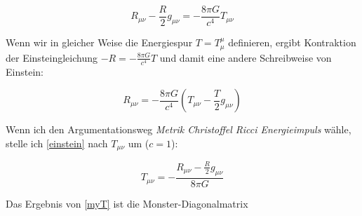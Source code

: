 \documentclass[12pt,a4paper]{article}
\begin{document}
\begin{equation}
R_{\mu\nu} - \frac{R}{2} g_{\mu\nu} = -\frac{8\pi G}{c^4} T_{\mu\nu} \label{einstein}
\end{equation}

Wenn wir in gleicher Weise die Energiespur $T = T^\mu_\mu$ definieren, ergibt Kontraktion der Einsteingleichung $-R = -\frac{8\pi G}{c^4} T$ und damit eine andere Schreibweise von Einstein:

\begin{equation}
R_{\mu \nu} = - \frac{8 \pi G}{c^4} \left( T_{\mu\nu} - \frac{T}{2} g_{\mu\nu} \right)
\end{equation}

Wenn ich den  Argumentationsweg {\it Metrik \dann Christoffel \dann Ricci \dann Energieimpuls } wähle, stelle ich \ref{einstein} nach $T_{\mu\nu}$ um ($c=1$):

\begin{equation}
T_{\mu \nu} = -\frac{R_{\mu \nu} - \frac{R}{2} g_{\mu\nu}}{8 \pi G} \label{myT}
\end{equation}

Das Ergebnis von \ref{myT} ist die Monster-Diagonalmatrix
\end{document}
